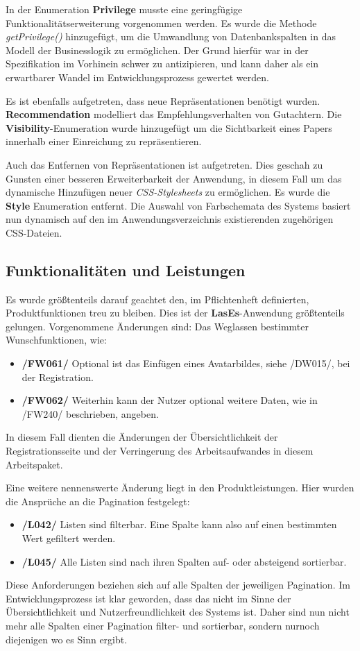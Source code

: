 In der  Enumeration \textbf{Privilege} musste eine geringfügige Funktionalitätserweiterung vorgenommen werden.
Es wurde die Methode \emph{getPrivilege()} hinzugefügt,
um die Umwandlung von Datenbankspalten in das Modell der Businesslogik zu ermöglichen.
Der Grund hierfür war in der Spezifikation im Vorhinein schwer zu antizipieren,
und kann daher als ein erwartbarer Wandel im Entwicklungsprozess gewertet werden.

Es ist ebenfalls aufgetreten, dass neue Repräsentationen benötigt wurden.
\textbf{Recommendation} modelliert
das Empfehlungsverhalten von Gutachtern.
Die \textbf{Visibility}-Enumeration wurde hinzugefügt um die Sichtbarkeit eines
Papers innerhalb einer Einreichung zu repräsentieren.

Auch das Entfernen von Repräsentationen ist aufgetreten.
Dies geschah zu Gunsten einer besseren Erweiterbarkeit der Anwendung, in diesem Fall um das dynamische Hinzufügen
neuer \emph{CSS-Stylesheets} zu ermöglichen.
Es wurde die \textbf{Style} Enumeration entfernt. Die Auswahl von Farbschemata des
Systems basiert nun dynamisch auf den im Anwendungsverzeichnis existierenden zugehörigen
CSS-Dateien.

\subsection{Funktionalitäten und Leistungen}

Es wurde größtenteils darauf geachtet den, im Pflichtenheft definierten, Produktfunktionen treu zu bleiben.
Dies ist der \textbf{LasEs}-Anwendung größtenteils gelungen.
Vorgenommene Änderungen sind:
\newline
Das Weglassen bestimmter Wunschfunktionen, wie:
\begin{itemize}
    \item \textbf{/FW061/} Optional ist das Einfügen eines Avatarbildes, siehe /DW015/, bei der Registration.
    \item \textbf{/FW062/} Weiterhin kann der Nutzer optional weitere Daten, wie in /FW240/ beschrieben, angeben.
\end{itemize}
In diesem Fall dienten die Änderungen der Übersichtlichkeit der Registrationsseite und der
Verringerung des Arbeitsaufwandes in diesem Arbeitspaket.

Eine weitere nennenswerte Änderung liegt in den Produktleistungen.
Hier wurden die Ansprüche an die Pagination festgelegt:
\begin{itemize}
    \item \textbf{/L042/} Listen sind filterbar.
    Eine Spalte kann also auf einen bestimmten Wert gefiltert werden.
    \item \textbf{/L045/} Alle Listen sind nach ihren Spalten auf- oder absteigend sortierbar.
\end{itemize}
Diese Anforderungen beziehen sich auf alle Spalten der jeweiligen Pagination.
Im Entwicklungsprozess ist klar geworden, dass das nicht im Sinne der Übersichtlichkeit
und Nutzerfreundlichkeit des Systems ist.
Daher sind nun nicht mehr alle Spalten einer Pagination filter- und sortierbar,
sondern nurnoch diejenigen wo es Sinn ergibt.


